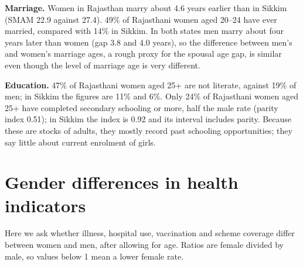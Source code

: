 \documentclass[10pt,a4paper]{article}
\begin{document}
\textbf{Marriage.} Women in Rajasthan marry about 4.6 years earlier than in Sikkim (SMAM 22.9 against 27.4). 49\% of Rajasthani women aged 20--24 have ever married, compared with 14\% in Sikkim. In both states men marry about four years later than women (gap 3.8 and 4.0 years), so the difference between men's and women's marriage ages, a rough proxy for the spousal age gap, is similar even though the level of marriage age is very different.


\textbf{Education.} 47\% of Rajasthani women aged 25+ are not literate, against 19\% of men; in Sikkim the figures are 11\% and 6\%. Only 24\% of Rajasthani women aged 25+ have completed secondary schooling or more, half the male rate (parity index 0.51); in Sikkim the index is 0.92 and its interval includes parity. Because these are stocks of adults, they mostly record past schooling opportunities; they say little about current enrolment of girls.


\section{Gender differences in health indicators}

Here we ask whether illness, hospital use, vaccination and scheme coverage differ between women and men, after allowing for age. Ratios are female divided by male, so values below 1 mean a lower female rate.
\end{document}
